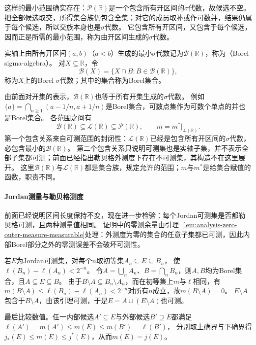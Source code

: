 这样的最小范围确实存在：$\mathcal P(\mathbb R)$是一个包含所有开区间的$\sigma$代数，故候选不空。
把全部候选取交，所得集合族仍包含全集；对它的成员取补或作可数并，结果仍属于每个候选，所以交族本身也是$\sigma$代数。
它包含所有开区间，又包含于每个候选，因而正是所需的最小范围，称为由开区间生成的$\sigma$代数。
\begin{definition}
\label{def:analysis-borel-sigma-algebra}
实轴上由所有开区间$(a,b)$（$a<b$）生成的最小$\sigma$代数记为$\mathcal B(\mathbb R)$，称为（Borel sigma-algebra）。
对$X\subseteq\mathbb R$，令
\[
 \mathcal B(X)=\{X\cap B:B\in\mathcal B(\mathbb R)\},
\]
称为$X$上的Borel $\sigma$代数；其中的集合称为Borel集合。
\end{definition}

由前面对开集的表示，$\mathcal B(\mathbb R)$也等于所有开集生成的$\sigma$代数。
例如$\{a\}=\bigcap_{n\geq1}(a-1/n,a+1/n)$是Borel集合，可数点集作为可数个单点的并也是Borel集合。
各范围之间有
\[
 \mathcal B(\mathbb R)\subseteq\mathcal L(\mathbb R)\subseteq\mathcal P(\mathbb R),
 \qquad m=m^*\big|_{\mathcal L(\mathbb R)}.
\]
第一个包含关系来自可测范围的封闭性：$\mathcal L(\mathbb R)$已经是包含所有开区间的$\sigma$代数，必包含最小的$\mathcal B(\mathbb R)$。
第二个包含关系只说明可测集也是实轴子集，并不表示全部子集都可测；前面已经指出勒贝格外测度下存在不可测集，其构造不在这里展开。
这里$\mathcal B(\mathbb R)$与$\mathcal L(\mathbb R)$都是集合族，规定允许的范围；$m$与$m^*$是给集合赋值的函数，职责不同。

\paragraph{Jordan测量与勒贝格测度}

前面已经说明区间长度保持不变，现在进一步检验：每个Jordan可测集是否都勒贝格可测，且两种测量值相同。
证明中的零测余量由引理~\ref{lem:analysis-zero-outer-measure-measurable}处理：外测度为零的集合的任意子集都已可测，因此内部Borel部分之外的零测误差不会破坏可测性。

若$E$为Jordan可测集，对每个$n$取初等集$A_n\subseteq E\subseteq B_n$，
使$\ell(B_n)-\ell(A_n)<2^{-n}$。
令$A=\bigcup_nA_n$、$B=\bigcap_nB_n$，则$A,B$均为Borel集合，且$A\subseteq E\subseteq B$。
由于$B\setminus A\subseteq B_n\setminus A_n$，而在初等集上$m$与$\ell$相同，有
$m(B\setminus A)\leq\ell(B_n)-\ell(A_n)<2^{-n}$对所有$n$成立，故$m(B\setminus A)=0$。
$E\setminus A$包含于$B\setminus A$，由该引理可测，于是$E=A\cup(E\setminus A)$也可测。

最后比较数值。任一内部候选$A'\subseteq E$与外部候选$B'\supseteq E$都满足$\ell(A')=m(A')\leq m(E)\leq m(B')=\ell(B')$，
分别取上确界与下确界得$j_*(E)\leq m(E)\leq j^*(E)$，从而$m(E)=j(E)$。

